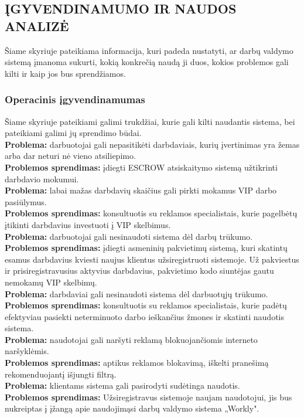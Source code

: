 \documentclass{VUMIFPSkursinis}
\begin{document}
\newpage
\subsection{ĮGYVENDINAMUMO IR NAUDOS ANALIZĖ}
Šiame skyriuje pateikiama informacija, kuri padeda nustatyti, ar darbų valdymo sistemą įmanoma sukurti, kokią konkrečią naudą ji duos, kokios problemos gali kilti ir kaip jos bus sprendžiamos.
\subsubsection{Operacinis įgyvendinamumas}
Šiame skyriuje pateikiami galimi trukdžiai, kurie gali kilti naudantis sistema, bei pateikiami galimi jų sprendimo būdai.\\ \newline
\textbf{Problema: }darbuotojai gali nepasitikėti darbdaviais, kurių įvertinimas yra žemas arba dar neturi nė vieno atsiliepimo.\\
\textbf{Problemos sprendimas: } įdiegti ESCROW atsiskaitymo sistemą užtikrinti darbdavio mokumui.\\  \newline
\textbf{Problema: }labai mažas darbdavių skaičius gali pirkti mokamus VIP darbo pasiūlymus.\\
\textbf{Problemos sprendimas: } konsultuotis su reklamos specialistais, kurie pagelbėtų įtikinti darbdavius investuoti į VIP skelbimus. \\  \newline
\textbf{Problema: }darbuotojai gali nesinaudoti sistema dėl darbų trūkumo.\\
\textbf{Problemos sprendimas: }įdiegti asmeninių pakvietimų sistemą, kuri skatintų esamus darbdavius kviesti naujus klientus užsiregistruoti sistemoje. Už pakviestus ir prisiregistravusius aktyvius darbdavius, pakvietimo kodo siuntėjas gautu nemokamų VIP skelbimų. \\  \newline
\textbf{Problema: }darbdaviai gali nesinaudoti sistema dėl darbuotųjų trūkumo.\\
\textbf{Problemos sprendimas: }konsultuotis su reklamos specialistais, kurie padėtų efektyviau pasiekti neterminuoto darbo ieškančius žmones ir skatinti naudotis sistema. \\ \newline
\textbf{Problema: }naudotojai gali naršyti reklamą blokuojančiomis interneto naršyklėmis.\\
\textbf{Problemos sprendimas: }aptikus reklamos blokavimą, iškelti pranešimą rekomenduojantį išjungti filtrą. \\  \newline
\textbf{Problema: }klientams sistema gali pasirodyti sudėtinga naudotis.\\
\textbf{Problemos sprendimas: }Užsiregistravus sistemoje naujam naudotojui, jis bus nukreiptas į įžangą apie naudojimąsi darbų valdymo sistema „Workly".\\ 
\end{document}
